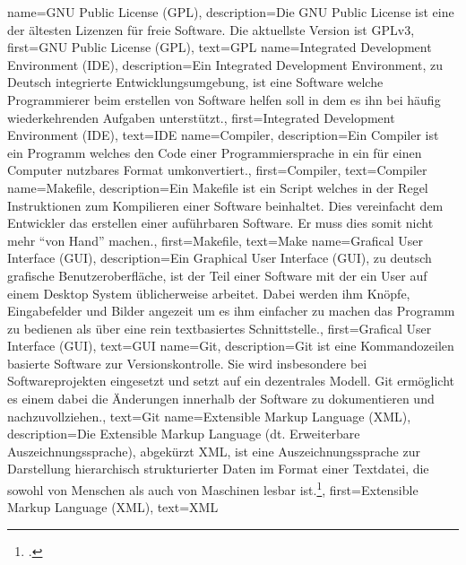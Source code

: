 {
    name={GNU Public License (GPL)},
    description={Die GNU Public License ist eine der ältesten Lizenzen für
      freie Software. Die aktuellste Version ist GPLv3},
    first={GNU Public License (GPL)},
    text={GPL}
}
{
    name={Integrated Development Environment (IDE)},
    description={Ein Integrated Development Environment, zu Deutsch integrierte
        Entwicklungsumgebung, ist eine Software welche Programmierer beim
        erstellen von Software helfen soll in dem es ihn bei häufig
        wiederkehrenden Aufgaben unterstützt.},
    first={Integrated Development Environment (IDE)},
    text={IDE}
}
{
    name={Compiler},
    description={Ein Compiler ist ein Programm welches den Code einer
      Programmiersprache in ein für einen Computer nutzbares Format
      umkonvertiert.},
    first={Compiler},
    text={Compiler}
}
{
    name={Makefile},
    description={Ein Makefile ist ein Script welches in der Regel Instruktionen
    zum Kompilieren einer Software beinhaltet. Dies vereinfacht dem Entwickler
    das erstellen einer auführbaren Software. Er muss dies somit nicht mehr
    ``von Hand'' machen.},
    first={Makefile},
    text={Make}
}
{
    name={Grafical User Interface (GUI)},
    description={Ein Graphical User Interface (GUI), zu deutsch grafische
      Benutzeroberfläche, ist der Teil einer Software mit der ein User auf
      einem Desktop System üblicherweise arbeitet. Dabei werden ihm Knöpfe,
      Eingabefelder und Bilder angezeit um es ihm einfacher zu machen das
      Programm zu bedienen als über eine rein textbasiertes Schnittstelle.},
    first={Grafical User Interface (GUI)},
    text={GUI}
}
{
    name={Git},
    description={Git ist eine Kommandozeilen basierte Software zur
      Versionskontrolle. Sie wird insbesondere bei Softwareprojekten eingesetzt
    und setzt auf ein dezentrales Modell. Git ermöglicht es einem dabei die
    Änderungen innerhalb der Software zu dokumentieren und nachzuvollziehen.},
    text={Git}
}
{
    name={Extensible Markup Language (XML)},
    description={Die Extensible Markup Language (dt. Erweiterbare
      Auszeichnungssprache), abgekürzt XML, ist eine Auszeichnungssprache zur
      Darstellung hierarchisch strukturierter Daten im Format einer Textdatei, die
      sowohl von Menschen als auch von Maschinen lesbar ist.\footcite{xml}},
    first={Extensible Markup Language (XML)},
    text={XML}
}
